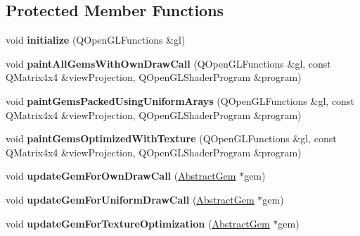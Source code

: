 \subsection*{Protected Member Functions}
\begin{DoxyCompactItemize}
\item 
\hypertarget{class_gem_renderer_a2d4dc2d6f9b1aae7dc1e8b8d09b153de}{}void {\bfseries initialize} (Q\+Open\+G\+L\+Functions \&gl)\label{class_gem_renderer_a2d4dc2d6f9b1aae7dc1e8b8d09b153de}

\item 
\hypertarget{class_gem_renderer_aaac7cf2429ddde7715e80b4e2014d484}{}void {\bfseries paint\+All\+Gems\+With\+Own\+Draw\+Call} (Q\+Open\+G\+L\+Functions \&gl, const Q\+Matrix4x4 \&view\+Projection, Q\+Open\+G\+L\+Shader\+Program \&program)\label{class_gem_renderer_aaac7cf2429ddde7715e80b4e2014d484}

\item 
\hypertarget{class_gem_renderer_ad9e201c7b6d1e49537e5bcab80f296e3}{}void {\bfseries paint\+Gems\+Packed\+Using\+Uniform\+Arays} (Q\+Open\+G\+L\+Functions \&gl, const Q\+Matrix4x4 \&view\+Projection, Q\+Open\+G\+L\+Shader\+Program \&program)\label{class_gem_renderer_ad9e201c7b6d1e49537e5bcab80f296e3}

\item 
\hypertarget{class_gem_renderer_a03cc6455c9b52c79c120097bbe03bbd9}{}void {\bfseries paint\+Gems\+Optimized\+With\+Texture} (Q\+Open\+G\+L\+Functions \&gl, const Q\+Matrix4x4 \&view\+Projection, Q\+Open\+G\+L\+Shader\+Program \&program)\label{class_gem_renderer_a03cc6455c9b52c79c120097bbe03bbd9}

\item 
\hypertarget{class_gem_renderer_a114291cb009678f06e889c46433d7076}{}void {\bfseries update\+Gem\+For\+Own\+Draw\+Call} (\hyperlink{class_abstract_gem}{Abstract\+Gem} $\ast$gem)\label{class_gem_renderer_a114291cb009678f06e889c46433d7076}

\item 
\hypertarget{class_gem_renderer_ac5257d21b1833cc9276c144c4722a18f}{}void {\bfseries update\+Gem\+For\+Uniform\+Draw\+Call} (\hyperlink{class_abstract_gem}{Abstract\+Gem} $\ast$gem)\label{class_gem_renderer_ac5257d21b1833cc9276c144c4722a18f}

\item 
\hypertarget{class_gem_renderer_a11f9e6827954a2ea7aff7b105d59c1a5}{}void {\bfseries update\+Gem\+For\+Texture\+Optimization} (\hyperlink{class_abstract_gem}{Abstract\+Gem} $\ast$gem)\label{class_gem_renderer_a11f9e6827954a2ea7aff7b105d59c1a5}

\end{DoxyCompactItemize}
